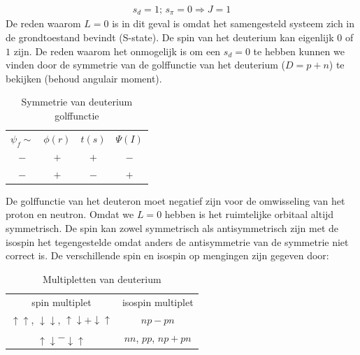 \documentclass[../main.tex]{subfiles}
\begin{document}
\begin{equation}
    \begin{aligned}
        \label{eq:grondtoestand_deuteron}
        s_d=1\text{; }s_\pi=0 \Rightarrow J=1
    \end{aligned}
\end{equation}
De reden waarom $L=0$ is in dit geval is omdat het samengesteld systeem zich in de grondtoestand bevindt (S-state). De spin van het deuterium kan eigenlijk $0$ of $1$ zijn. De reden waarom het onmogelijk is om een $s_d=0$ te hebben kunnen we vinden door de symmetrie van de golffunctie van het deuterium ($D=p+n$) te bekijken (behoud angulair moment).
\newpage

\begin{table}[h]
    \centering
    \caption{Symmetrie van deuterium golffunctie}
    \label{tab:sym_deut_golf}
    \begin{tabular}{cccc}
        $\psi_f\sim$ & $\phi(r)$ & $t(s)$                & $\Psi(I)$             \\
        $-$             & $+$       & {\color{green} $+$}   & {\color{green} $-$}   \\
        $-$             & $+$       & {\color{red} $-$}     & {\color{red} $+$}     \\
    \end{tabular}
\end{table}

De golffunctie van het deuteron moet negatief zijn voor de omwisseling van het proton en neutron. Omdat we $L=0$ hebben is het ruimtelijke orbitaal altijd symmetrisch. De spin kan zowel symmetrisch als antisymmetrisch zijn met de isospin het tegengestelde omdat anders de antisymmetrie van de symmetrie niet correct is. De verschillende spin en isospin op mengingen zijn gegeven door:

\begin{table}[h]
    \centering
    \caption{Multipletten van deuterium}
    \label{tab:mult_deut}
    \begin{tabular}{cc}
        spin multiplet & isospin multiplet \\
        {\color{green} $\uparrow\uparrow$, $\downarrow\downarrow$, $\uparrow\downarrow+\downarrow\uparrow$} & {\color{green} $np-pn$} \\
        {\color{red} $\uparrow\downarrow-\downarrow\uparrow$} & {\color{red} $nn$, $pp$, $np+pn$}
    \end{tabular}
\end{table}
\end{document}
